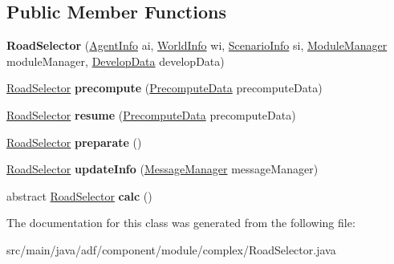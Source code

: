 \subsection*{Public Member Functions}
\begin{DoxyCompactItemize}
\item 
\hypertarget{classadf_1_1component_1_1module_1_1complex_1_1RoadSelector_af7494eba9fe7c3b0509d3b3015f94e16}{}\label{classadf_1_1component_1_1module_1_1complex_1_1RoadSelector_af7494eba9fe7c3b0509d3b3015f94e16} 
{\bfseries Road\+Selector} (\hyperlink{classadf_1_1agent_1_1info_1_1AgentInfo}{Agent\+Info} ai, \hyperlink{classadf_1_1agent_1_1info_1_1WorldInfo}{World\+Info} wi, \hyperlink{classadf_1_1agent_1_1info_1_1ScenarioInfo}{Scenario\+Info} si, \hyperlink{classadf_1_1agent_1_1module_1_1ModuleManager}{Module\+Manager} module\+Manager, \hyperlink{classadf_1_1agent_1_1develop_1_1DevelopData}{Develop\+Data} develop\+Data)
\item 
\hypertarget{classadf_1_1component_1_1module_1_1complex_1_1RoadSelector_ad696e9c2bc0de5b13f0ebf1cf982aeb2}{}\label{classadf_1_1component_1_1module_1_1complex_1_1RoadSelector_ad696e9c2bc0de5b13f0ebf1cf982aeb2} 
\hyperlink{classadf_1_1component_1_1module_1_1complex_1_1RoadSelector}{Road\+Selector} {\bfseries precompute} (\hyperlink{classadf_1_1agent_1_1precompute_1_1PrecomputeData}{Precompute\+Data} precompute\+Data)
\item 
\hypertarget{classadf_1_1component_1_1module_1_1complex_1_1RoadSelector_a714e2b434283d0f6d0cd038a49184756}{}\label{classadf_1_1component_1_1module_1_1complex_1_1RoadSelector_a714e2b434283d0f6d0cd038a49184756} 
\hyperlink{classadf_1_1component_1_1module_1_1complex_1_1RoadSelector}{Road\+Selector} {\bfseries resume} (\hyperlink{classadf_1_1agent_1_1precompute_1_1PrecomputeData}{Precompute\+Data} precompute\+Data)
\item 
\hypertarget{classadf_1_1component_1_1module_1_1complex_1_1RoadSelector_abf6fdb18762017e1ee396f2ee2bb3585}{}\label{classadf_1_1component_1_1module_1_1complex_1_1RoadSelector_abf6fdb18762017e1ee396f2ee2bb3585} 
\hyperlink{classadf_1_1component_1_1module_1_1complex_1_1RoadSelector}{Road\+Selector} {\bfseries preparate} ()
\item 
\hypertarget{classadf_1_1component_1_1module_1_1complex_1_1RoadSelector_a754df77f8029813b7130e547673b5878}{}\label{classadf_1_1component_1_1module_1_1complex_1_1RoadSelector_a754df77f8029813b7130e547673b5878} 
\hyperlink{classadf_1_1component_1_1module_1_1complex_1_1RoadSelector}{Road\+Selector} {\bfseries update\+Info} (\hyperlink{classadf_1_1agent_1_1communication_1_1MessageManager}{Message\+Manager} message\+Manager)
\item 
\hypertarget{classadf_1_1component_1_1module_1_1complex_1_1RoadSelector_aa3b43c32e1629f8db1470c3a241e6b57}{}\label{classadf_1_1component_1_1module_1_1complex_1_1RoadSelector_aa3b43c32e1629f8db1470c3a241e6b57} 
abstract \hyperlink{classadf_1_1component_1_1module_1_1complex_1_1RoadSelector}{Road\+Selector} {\bfseries calc} ()
\end{DoxyCompactItemize}


The documentation for this class was generated from the following file\+:\begin{DoxyCompactItemize}
\item 
src/main/java/adf/component/module/complex/Road\+Selector.\+java\end{DoxyCompactItemize}
